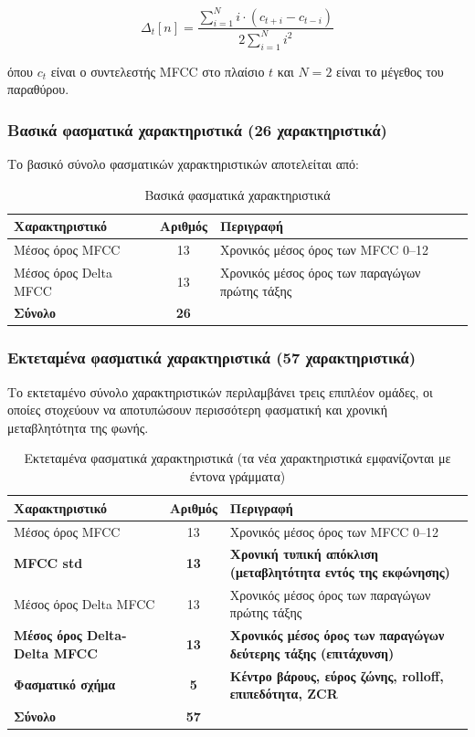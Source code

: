 \begin{equation}
\Delta_t[n] = \frac{\sum_{i=1}^{N} i \cdot (c_{t+i} - c_{t-i})}{2 \sum_{i=1}^{N} i^2}
\label{eq:delta}
\end{equation}

όπου $c_t$ είναι ο συντελεστής MFCC στο πλαίσιο $t$ και $N=2$ είναι το μέγεθος του παραθύρου.

\subsubsection{Βασικά φασματικά χαρακτηριστικά (26 χαρακτηριστικά)}

Το βασικό σύνολο φασματικών χαρακτηριστικών αποτελείται από:

\begin{table}[H]
\centering
\begin{tabular}{@{}lcp{7cm}@{}}
\toprule
\textbf{Χαρακτηριστικό} & \textbf{Αριθμός} & \textbf{Περιγραφή} \\
\midrule
Μέσος όρος MFCC & 13 & Χρονικός μέσος όρος των MFCC 0--12 \\
Μέσος όρος Delta MFCC & 13 & Χρονικός μέσος όρος των παραγώγων πρώτης τάξης \\
\midrule
\textbf{Σύνολο} & \textbf{26} & \\
\bottomrule
\end{tabular}
\caption{Βασικά φασματικά χαρακτηριστικά}
\label{tab:baseline-spectral}
\end{table}

\subsubsection{Εκτεταμένα φασματικά χαρακτηριστικά (57 χαρακτηριστικά)}

Το εκτεταμένο σύνολο χαρακτηριστικών περιλαμβάνει τρεις επιπλέον ομάδες, οι οποίες στοχεύουν να αποτυπώσουν περισσότερη φασματική και χρονική μεταβλητότητα της φωνής.

\begin{table}[H]
\centering
\begin{tabular}{@{}lcp{7cm}@{}}
\toprule
\textbf{Χαρακτηριστικό} & \textbf{Αριθμός} & \textbf{Περιγραφή} \\
\midrule
Μέσος όρος MFCC & 13 & Χρονικός μέσος όρος των MFCC 0--12 \\
\textbf{MFCC std} & \textbf{13} & \textbf{Χρονική τυπική απόκλιση (μεταβλητότητα εντός της εκφώνησης)} \\
Μέσος όρος Delta MFCC & 13 & Χρονικός μέσος όρος των παραγώγων πρώτης τάξης \\
\textbf{Μέσος όρος Delta-Delta MFCC} & \textbf{13} & \textbf{Χρονικός μέσος όρος των παραγώγων δεύτερης τάξης (επιτάχυνση)} \\
\textbf{Φασματικό σχήμα} & \textbf{5} & \textbf{Κέντρο βάρους, εύρος ζώνης, rolloff, επιπεδότητα, ZCR} \\
\midrule
\textbf{Σύνολο} & \textbf{57} & \\
\bottomrule
\end{tabular}
\caption{Εκτεταμένα φασματικά χαρακτηριστικά (τα νέα χαρακτηριστικά εμφανίζονται με έντονα γράμματα)}
\label{tab:extended-spectral}
\end{table}

